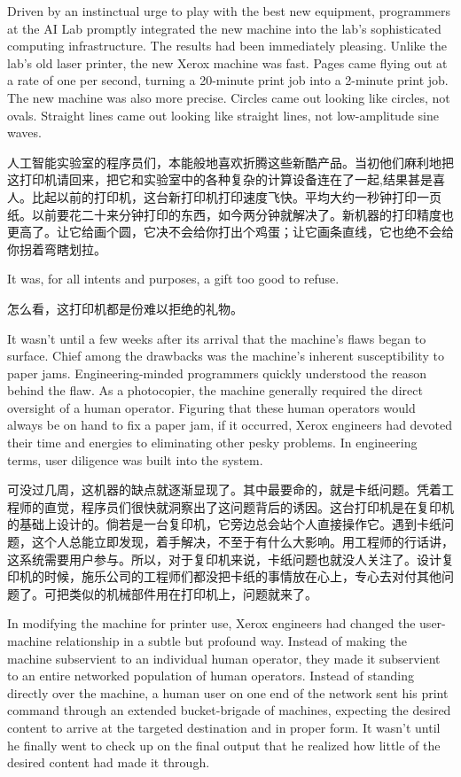 \ifdefined\eng
Driven by an instinctual urge to play with the best new equipment, programmers at the AI Lab promptly integrated the new machine into the lab's sophisticated computing infrastructure. The results had been immediately pleasing. Unlike the lab's old laser printer, the new Xerox machine was fast. Pages came flying out at a rate of one per second, turning a 20-minute print job into a 2-minute print job. The new machine was also more precise. Circles came out looking like circles, not ovals. Straight lines came out looking like straight lines, not low-amplitude sine waves.
\fi

\ifdefined\chs
人工智能实验室的程序员们，本能般地喜欢折腾这些新酷产品。当初他们麻利地把这打印机请回来，把它和实验室中的各种复杂的计算设备连在了一起,结果甚是喜人。比起以前的打印机，这台新打印机打印速度飞快。平均大约一秒钟打印一页纸。以前要花二十来分钟打印的东西，如今两分钟就解决了。新机器的打印精度也更高了。让它给画个圆，它决不会给你打出个鸡蛋；让它画条直线，它也绝不会给你拐着弯瞎划拉。
\fi

\ifdefined\eng
It was, for all intents and purposes, a gift too good to refuse.
\fi

\ifdefined\chs
怎么看，这打印机都是份难以拒绝的礼物。
\fi

\ifdefined\eng
It wasn't until a few weeks after its arrival that the machine's flaws began to surface. Chief among the drawbacks was the machine's inherent susceptibility to paper jams. Engineering-minded programmers quickly understood the reason behind the flaw. As a photocopier, the machine generally required the direct oversight of a human operator. Figuring that these human operators would always be on hand to fix a paper jam, if it occurred, Xerox engineers had devoted their time and energies to eliminating other pesky problems. In engineering terms, user diligence was built into the system.
\fi

\ifdefined\chs
可没过几周，这机器的缺点就逐渐显现了。其中最要命的，就是卡纸问题。凭着工程师的直觉，程序员们很快就洞察出了这问题背后的诱因。这台打印机是在复印机的基础上设计的。倘若是一台复印机，它旁边总会站个人直接操作它。遇到卡纸问题，这个人总能立即发现，着手解决，不至于有什么大影响。用工程师的行话讲，这系统需要用户参与。所以，对于复印机来说，卡纸问题也就没人关注了。设计复印机的时候，施乐公司的工程师们都没把卡纸的事情放在心上，专心去对付其他问题了。可把类似的机械部件用在打印机上，问题就来了。
\fi

\ifdefined\eng
In modifying the machine for printer use, Xerox engineers had changed the user-machine relationship in a subtle but profound way. Instead of making the machine subservient to an individual human operator, they made it subservient to an entire networked population of human operators. Instead of standing directly over the machine, a human user on one end of the network sent his print command through an extended bucket-brigade of machines, expecting the desired content to arrive at the targeted destination and in proper form. It wasn't until he finally went to check up on the final output that he realized how little of the desired content had made it through.
\fi

